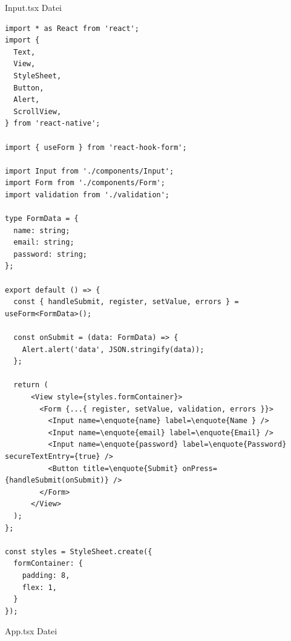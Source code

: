 \documentclass[11pt, twoside]{article}
\begin{document}
\begin{appendix}
\begin{listing}[H]
\caption[Input.tsx]{Input.tsx Datei}
\end{listing}


 

\begin{listing}[H]
	\label{lst:quelltext9}

    \begin{verbatim}
import * as React from 'react';
import {
  Text,
  View,
  StyleSheet,
  Button,
  Alert,
  ScrollView,
} from 'react-native';

import { useForm } from 'react-hook-form';

import Input from './components/Input';
import Form from './components/Form';
import validation from './validation';

type FormData = {
  name: string;
  email: string;
  password: string;
};

export default () => {
  const { handleSubmit, register, setValue, errors } = useForm<FormData>();

  const onSubmit = (data: FormData) => {
	Alert.alert('data', JSON.stringify(data));
  };

  return (
	  <View style={styles.formContainer}>
		<Form {...{ register, setValue, validation, errors }}>
		  <Input name=\enquote{name} label=\enquote{Name } />
		  <Input name=\enquote{email} label=\enquote{Email} />
		  <Input name=\enquote{password} label=\enquote{Password} secureTextEntry={true} />
		  <Button title=\enquote{Submit} onPress={handleSubmit(onSubmit)} />
		</Form>
	  </View>
  );
};

const styles = StyleSheet.create({
  formContainer: {
	padding: 8,
	flex: 1,
  }
});		
\end{verbatim}


\caption[App.tsx]{App.tsx Datei}
\end{listing}


\end{appendix} 


\printbibliography{}




% 
% 
\end{document}
